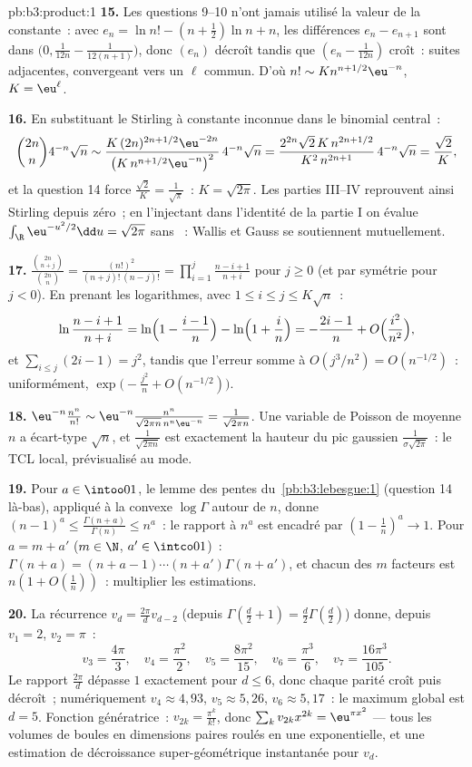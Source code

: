 \begin{solution}{pb:b3:product:1}
\textbf{15.} Les questions 9--10 n'ont jamais utilisé la
valeur de la constante~: avec $e_n = \ln n! - (n+\frac12)\ln
n + n$, les différences $e_n - e_{n+1}$ sont dans
$\bigl(0, \frac1{12n} - \frac1{12(n+1)}\bigr)$, donc
$(e_n)$ décroît tandis que $(e_n - \frac1{12n})$ croît~:
suites adjacentes, convergeant vers un $\ell$ commun. D'où
$n! \sim K n^{n+1/2}\eu^{-n}$, $K = \eu^\ell$.

\textbf{16.} En substituant le Stirling à constante inconnue
dans le binomial central~:
\[
\binom{2n}n4^{-n}\sqrt n \sim
\frac{K\,(2n)^{2n+1/2}\eu^{-2n}}{\bigl(K\,n^{n+1/2}
\eu^{-n}\bigr)^2}\,4^{-n}\sqrt n
= \frac{2^{2n}\sqrt{2}\,K\,n^{2n+1/2}}{K^2\,n^{2n+1}}
\,4^{-n}\sqrt n = \frac{\sqrt2}{K},
\]
et la question 14 force $\frac{\sqrt2}K = \frac1{\sqrt\pi}$~:
$K = \sqrt{2\pi}$. Les parties III--IV reprouvent ainsi
Stirling depuis zéro~; en l'injectant dans l'identité de la
partie I on évalue $\int_\R\eu^{-u^2/2}\dd u = \sqrt{2\pi}$
sans ~: Wallis et Gauss se soutiennent
mutuellement.

\textbf{17.} $\frac{\binom{2n}{n+j}}{\binom{2n}n} =
\frac{(n!)^2}{(n+j)!\,(n-j)!} =
\prod_{i=1}^{j}\frac{n-i+1}{n+i}$ pour $j \geq 0$ (et par
symétrie pour $j < 0$). En prenant les logarithmes, avec $1
\leq i \leq j \leq K\sqrt n$~:
\[
\ln\frac{n-i+1}{n+i} = \ln\Bigl(1 - \frac{i-1}n\Bigr) -
\ln\Bigl(1 + \frac in\Bigr) = -\frac{2i-1}{n} +
O\Bigl(\frac{i^2}{n^2}\Bigr),
\]
et $\sum_{i\leq j}(2i - 1) = j^2$, tandis que l'erreur
somme à $O(j^3/n^2) = O(n^{-1/2})$~: uniformément,
$\exp\bigl(-\frac{j^2}n + O(n^{-1/2})\bigr)$.

\textbf{18.} $\eu^{-n}\frac{n^n}{n!} \sim \eu^{-n}
\frac{n^n}{\sqrt{2\pi n}\,n^n\eu^{-n}} =
\frac1{\sqrt{2\pi n}}$. Une variable de Poisson de moyenne
$n$ a écart-type $\sqrt n$, et $\frac1{\sqrt{2\pi n}}$ est
exactement la hauteur du pic gaussien
$\frac1{\sigma\sqrt{2\pi}}$~: le TCL local, prévisualisé au
mode.

\textbf{19.} Pour $a \in \intoo01$, le lemme des pentes
du~\cref{pb:b3:lebesgue:1} (question 14 là-bas), appliqué à
la convexe $\log\Gamma$ autour de $n$, donne $(n-1)^a \leq
\frac{\Gamma(n+a)}{\Gamma(n)} \leq n^a$~: le rapport à $n^a$
est encadré par $(1 - \frac1n)^a \to 1$. Pour $a = m + a'$
($m \in \N$, $a' \in \intco01$)~: $\Gamma(n+a) = (n + a - 1)
\cdots(n + a')\Gamma(n + a')$, et chacun des $m$ facteurs
est $n(1 + O(\frac1n))$~: multiplier les estimations.

\textbf{20.} La récurrence $v_d = \frac{2\pi}dv_{d-2}$
(depuis $\Gamma(\frac d2 + 1) = \frac d2\Gamma(\frac d2)$)
donne, depuis $v_1 = 2$, $v_2 = \pi$~:
\[
v_3 = \frac{4\pi}3,\quad v_4 = \frac{\pi^2}2,\quad
v_5 = \frac{8\pi^2}{15},\quad v_6 = \frac{\pi^3}6,\quad
v_7 = \frac{16\pi^3}{105}.
\]
Le rapport $\frac{2\pi}d$ dépasse $1$ exactement pour $d
\leq 6$, donc chaque parité croît puis décroît~;
numériquement $v_4 \approx 4{,}93$, $v_5 \approx 5{,}26$,
$v_6 \approx 5{,}17$~: le maximum global est $d = 5$.
Fonction génératrice~: $v_{2k} = \frac{\pi^k}{k!}$, donc
$\sum_kv_{2k}x^{2k} = \eu^{\pi x^2}$ --- tous les volumes de
boules en dimensions paires roulés en une exponentielle, et
une estimation de décroissance super-géométrique instantanée
pour $v_d$.


\end{solution}
